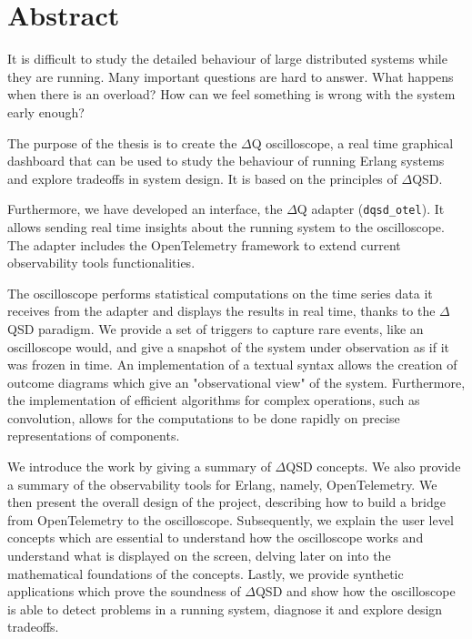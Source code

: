 \chapter*{Abstract}
    It is difficult to study the detailed behaviour of large distributed systems while they are running. Many important questions are hard to answer. What happens when there is an overload? How can we feel something is wrong with the system early enough?

    The purpose of the thesis is to create the $\Delta$Q oscilloscope, a real time graphical dashboard that can be used to study the behaviour of running Erlang systems and explore tradeoffs in system design. It is based on the principles of $\Delta$QSD.
  
    Furthermore, we have developed an interface, the $\Delta$Q adapter (\texttt{dqsd\_otel}). It allows sending real time insights about the running system to the oscilloscope. The adapter includes the OpenTelemetry framework to extend current observability tools functionalities.
    
    The oscilloscope performs statistical computations on the time series data it receives from the adapter and displays the results in real time, thanks to the $\Delta$QSD paradigm. We provide a set of triggers to capture rare events, like an oscilloscope would, and give a snapshot of the system under observation as if it was frozen in time. An implementation of a textual syntax allows the creation of outcome diagrams which give an "observational view" of the system. Furthermore, the implementation of efficient algorithms for complex operations, such as convolution, allows for the computations to be done rapidly on precise representations of components.

    We introduce the work by giving a summary of $\Delta$QSD concepts. We also provide a summary of the observability tools for Erlang, namely, OpenTelemetry. We then present the overall design of the project, describing how to build a bridge from OpenTelemetry to the oscilloscope. Subsequently, we explain the user level concepts which are essential to understand how the oscilloscope works and understand what is displayed on the screen, delving later on into the mathematical foundations of the concepts. Lastly, we provide synthetic applications which prove the soundness of $\Delta$QSD and show how the oscilloscope is able to detect problems in a running system, diagnose it and explore design tradeoffs.



